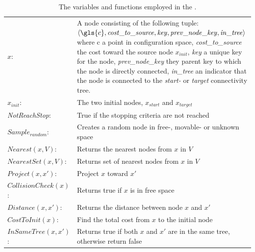 \noindent
\begin{table}[H]
\caption{The variables and functions employed in the .}
\label{table:functions_for_proposed_rrt_star}
\centering
  \begin{tabular}%
  {>{\raggedright\arraybackslash}p{}%
   >{\raggedright\arraybackslash}p{}}
   $x$:& A node consisting of the following tuple: $ \left\langle \gls{c}, \mathit{cost\_to\_source}, \mathit{key}, \mathit{prev\_node\_key}, \mathit{in\_tree} \right\rangle$ where \gls{c} a point in configuration space, \textit{cost\_to\_source} the cost toward the source node $x_{init}$, \textit{key} a unique key for the node, \textit{prev\_node\_key} they parent key to which the node is directly connected, \textit{in\_tree} an indicator that the node is connected to the \textit{start-} or \textit{target} connectivity tree.\\
   $x_{init}$:& The two initial nodes, $x_{\mathit{start}}$ and $x_{\mathit{target}}$\\
  \textit{NotReachStop}:& True if the stopping criteria are not reached\\
  $\mathit{Sample_{random}}$:& Creates a random node in free-, movable- or unknown space\\
  $\mathit{Nearest}(x, V)$:& Returns the nearest nodes from $x$ in $V$\\
  $\mathit{NearestSet}(x, V)$:& Returns set of nearest nodes from $x$ in $V$\\
  $\mathit{Project}(x, x')$:& Project $x$ toward $x'$\\
  $\mathit{CollisionCheck}(x)$:& Returns true if $x$ is in free space\\
  $\mathit{Distance}(x, x')$:& Returns the distance between node $x$ and $x'$\\
  $\mathit{CostToInit}(x)$:& Find the total cost from $x$ to the initial node\\
    $\mathit{InSameTree}(x, x')$:& Returns true if both $x$ and $x'$ are in the same tree, otherwise return false\\
  \end{tabular}
\end{table}

